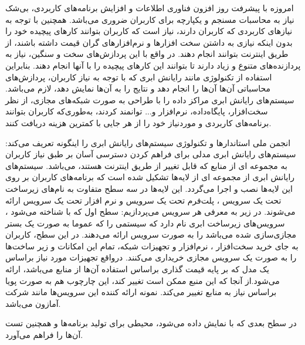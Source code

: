  امروزه با پیشرفت روز افزون فناوری اطلاعات و افزایش برنامه‌های کاربردی، 
 بی‌شک نیاز به محاسبات مسنجم و یکپارچه برای کاربران ضروری می‌باشد.
 همچنین با توجه به نیازهای کاربردی که کاربران دارند، 
 نیاز است که کاربران بتوانند کارهای پیچیده خود را بدون  اینکه 
 نیازی به داشتن سخت افزارها و نرم‌افزارهای گران قیمت داشته باشند، 
 از طریق اینترنت بتوانند انجام دهند. در واقع با این پردازش‌های سخت و سنگین، 
 نیاز به پردازنده‌های متنوع و زیاد دارند تا بتوانند این کارهای پیچیده را با آنها انجام دهند. بنابراین استفاده از تکنولوژی مانند رایانش ابری که با توجه به نیاز کاربران، پردازش‌های محاسباتی آن‌ها آن‌ها را انجام دهد و نتایج را به آن‌ها 
 نمایش دهد، لازم می‌باشد. سیستم‌های رایانش ابری مراکز داده را با طراحی به صورت شبکه‌های مجازی، از نظر سخت‌افزار، پایگاه‌داده، نرم‌افزار و... توانمند کردند، 
 به‌طوری‌که کاربران بتوانند برنامه‌های کاربردی و موردنیاز خود را از هر جایی  با کمترین هزینه دریافت کنند.
  \cite{define,num2}
  
  انجمن ملی استاندارها و تکنولوژی سیستم‌های رایانش ابری را اینگونه تعریف می‌کند: سیستم‌های رایانش ابری مدلی برای فراهم کردن دسترسی آسان بر طبق نیاز کاربران به مجموعه ای از منابع که قابل تغییر از طریق اینترنت هستند، می‌باشد.
  \cite{define}
   سیستم‌های رایانش ابری از مجموعه ای از لایه‌ها تشکیل شده است که برنامه‌های کاربران بر روی این لایه‌ها نصب و اجرا می‌گردد. این لایه‌ها در سه سطح متفاوت به نام‌های زیرساخت تحت یک سرویس
    ، پلت‌فرم تحت یک سرویس
     و نرم ‌افزار تحت یک سرویس
     ارائه می‌شوند. در زیر به معرفی هر سرویس می‌پردازیم:
 سطح اول که با 
 شناخته می‌شود ، سرویس‌های زیرساخت ابری نام دارد که سیستمی‌ را که عموما به صورت یک بستر مجازی‌سازی شده می‌باشد را به صورت سرویس ارائه می‌دهند. در این سطح، کاربران به جای خرید سخت‌افزار ، نرم‌افزار و تجهیزات شبکه، تمام این امکانات و زیر ساخت‌ها را به صورت یک سرویس مجازی خریداری می‌کنند. درواقع تجهیزات مورد نیاز براساس یک مدل که بر پایه قیمت گذاری براساس استفاده آن‌ها از منابع می‌باشد، ارائه می‌شود.از آنجا که این منبع ممکن است تغییر کند، این چارچوب هم به صورت پویا براساس نیاز به منابع تغییر می‌کند. نمونه ارائه کننده این سرویس‌ها مانند شرکت آمازون می‌باشد.
   
 در سطح بعدی که با 
  نمایش داده می‌شود، محیطی برای تولید برنامه‌ها و همچنین تست آن‌ها  را فراهم می‌آورد. 
  
